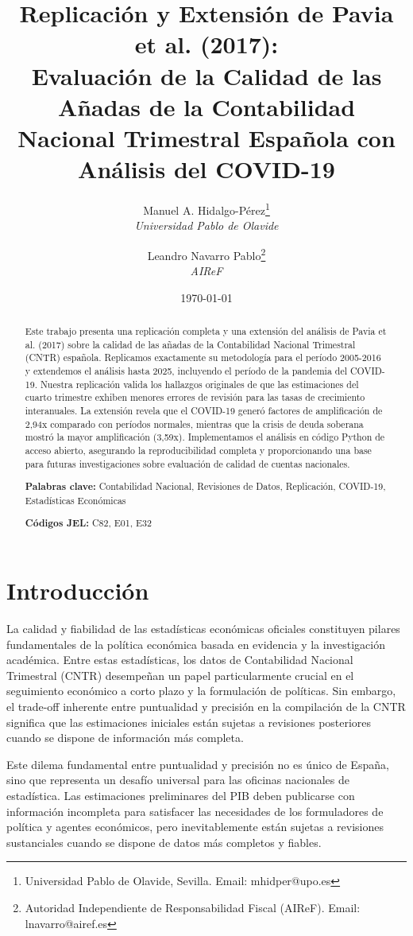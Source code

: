 \documentclass[12pt,a4paper]{article}
\title{\textbf{Replicación y Extensión de Pavia et al. (2017): \\Evaluación de la Calidad de las Añadas de la Contabilidad Nacional Trimestral Española con Análisis del COVID-19}}
\author{
    Manuel A. Hidalgo-Pérez\thanks{Universidad Pablo de Olavide, Sevilla. Email: mhidper@upo.es} \\ 
    \textit{Universidad Pablo de Olavide} \\[0.5em]
    \and
    Leandro Navarro Pablo\thanks{Autoridad Independiente de Responsabilidad Fiscal (AIReF). Email: lnavarro@airef.es} \\
    \textit{AIReF}
}
\date{\today}
\begin{document}
\maketitle

\begin{abstract}
\noindent Este trabajo presenta una replicación completa y una extensión del análisis de Pavia et al. (2017) sobre la calidad de las añadas de la Contabilidad Nacional Trimestral (CNTR) española. Replicamos exactamente su metodología para el período 2005-2016 y extendemos el análisis hasta 2025, incluyendo el período de la pandemia del COVID-19. Nuestra replicación valida los hallazgos originales de que las estimaciones del cuarto trimestre exhiben menores errores de revisión para las tasas de crecimiento interanuales. La extensión revela que el COVID-19 generó factores de amplificación de 2,94x comparado con períodos normales, mientras que la crisis de deuda soberana mostró la mayor amplificación (3,59x). Implementamos el análisis en código Python de acceso abierto, asegurando la reproducibilidad completa y proporcionando una base para futuras investigaciones sobre evaluación de calidad de cuentas nacionales.

\noindent \textbf{Palabras clave:} Contabilidad Nacional, Revisiones de Datos, Replicación, COVID-19, Estadísticas Económicas

\noindent \textbf{Códigos JEL:} C82, E01, E32
\end{abstract}

\newpage

\section{Introducción}

La calidad y fiabilidad de las estadísticas económicas oficiales constituyen pilares fundamentales de la política económica basada en evidencia y la investigación académica. Entre estas estadísticas, los datos de Contabilidad Nacional Trimestral (CNTR) desempeñan un papel particularmente crucial en el seguimiento económico a corto plazo y la formulación de políticas. Sin embargo, el trade-off inherente entre puntualidad y precisión en la compilación de la CNTR significa que las estimaciones iniciales están sujetas a revisiones posteriores cuando se dispone de información más completa.

Este dilema fundamental entre puntualidad y precisión no es único de España, sino que representa un desafío universal para las oficinas nacionales de estadística. Las estimaciones preliminares del PIB deben publicarse con información incompleta para satisfacer las necesidades de los formuladores de política y agentes económicos, pero inevitablemente están sujetas a revisiones sustanciales cuando se dispone de datos más completos y fiables.
\end{document}
